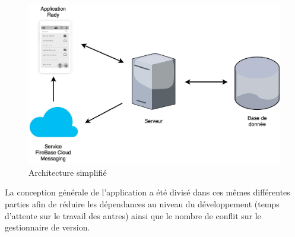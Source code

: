 \documentclass[french]{article}
\begin{document}
		\begin{figure}[H]
			\centering
			\includegraphics[scale=0.20]{../schema/schema-simplifie.jpg}
			\caption{Architecture simplifié}
			\label{Architecture simplifié}
		\end{figure}
		
		La conception générale de l'application a été divisé dans ces mêmes différentes parties afin de réduire les dépendances au niveau du développement (temps d'attente sur le travail des autres) ainsi que le nombre de conflit sur le gestionnaire de version.
		
\end{document}
